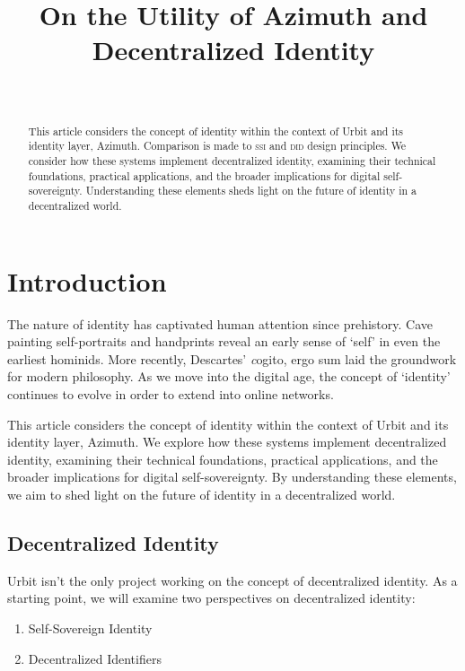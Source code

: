 \documentclass[twoside]{article}
\title{On the Utility of Azimuth and Decentralized Identity}
\author{\authorname~\authorpatp \\ \affiliation}
\date{}
\begin{document}
\maketitle
\thispagestyle{firststyle}

\begin{abstract}
  This article considers the concept of identity within the context of Urbit and its identity layer, Azimuth.  Comparison is made to \textsc{ssi} and \textsc{did} design principles.  We consider how these systems implement decentralized identity, examining their technical foundations, practical applications, and the broader implications for digital self-sovereignty.  Understanding these elements sheds light on the future of identity in a decentralized world.
\end{abstract}

\setcounter{page}{1}

\tableofcontents

\section{Introduction}

The nature of identity has captivated human attention since prehistory. Cave painting self-portraits and handprints reveal an early sense of `self' in even the earliest hominids. More recently, Descartes' {\emph cogito, ergo sum} laid the groundwork for modern philosophy. As we move into the digital age, the concept of `identity' continues to evolve in order to extend into online networks.

This article considers the concept of identity within the context of Urbit and its identity layer, Azimuth. We explore how these systems implement decentralized identity, examining their technical foundations, practical applications, and the broader implications for digital self-sovereignty. By understanding these elements, we aim to shed light on the future of identity in a decentralized world.

\subsection{Decentralized Identity}

Urbit isn't the only project working on the concept of decentralized identity. As a starting point, we will examine two perspectives on decentralized identity:

\begin{enumerate}
  \item Self-Sovereign Identity
  \item Decentralized Identifiers
\end{enumerate}
\end{document}
